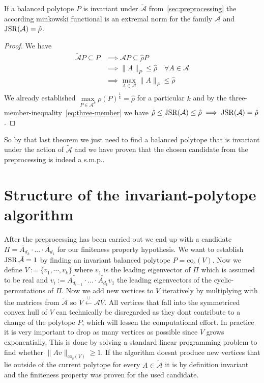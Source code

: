 \begin{theorem}
    If a balanced polytope $P$ is invariant under $\tilde{\mathcal{A}}$ from~\ref{sec:preprocessing}
    the according minkowski functional is an extremal norm for the family $\mathcal{A}$ and $ \operatorname{JSR}(\mathcal{A}) = \hat{\rho}$.
\end{theorem}
\begin{proof}
    We have 
    $$
    \begin{aligned}
    \tilde{\mathcal{A}}P \subseteq  P & \implies \mathcal{A}P \subseteq \hat{\rho}P \\
    & \implies \lVert A \rVert _P \le \hat{\rho} \quad \forall A \in \mathcal{A} \\
    & \implies \max \limits_{A \in \mathcal{A}} \lVert A \rVert _P \le \hat{\rho} \\
    \end{aligned}
    $$
    We already established $\max \limits_{P \in \mathcal{A}^{k}} \rho(P)^{\frac{1}{k}} = \hat{\rho}$ for a particular $k$
    and by the three-member-inequality~\ref{eq:three-member} we have $ \hat{\rho} \le \operatorname{JSR}(\mathcal{A}) \le \hat{\rho} \implies \operatorname{JSR}(\mathcal{A}) = \hat{\rho}$ .
\end{proof}
So by that last theorem we just need to find a balanced polytope that is invariant under the action of $\tilde{\mathcal{A}}$ and we have proven that the chosen candidate from the preprocessing is indeed a s.m.p..

\section{Structure of the invariant-polytope algorithm}
After the preprocessing has been carried out we end up with a candidate $\Pi = \tilde{A_{d_k}} \cdot ... \cdot \tilde{A_{d_1}}$ for our finiteness property hypothesis. We want to establish $\operatorname{JSR}{\tilde{\mathcal{A}}} = 1$ by finding an invariant balanced polytope $P = \text{co}_{\text{s}}(V)$. Now we define $V := \{ v_1, \cdots, v_k \}$ where $v_1$ is the leading eigenvector of $\Pi$ which is assumed to be real and $v_i := \tilde{A_{d_{i-1}}}\cdot ... \cdot \tilde{A_{d_1}}v_1$ the leading eigenvectors of the cyclic-permutations of $\Pi$. 
Now we add new vertices to $V$ iteratively by multiplying with the matrices from $\tilde{\mathcal{A}}$ so $V \xleftarrow{\cup} \mathcal{A}V$. All vertices that fall into the symmetriced convex hull of $V$ can technically be disregarded as they dont contribute to a change of the polytope $P$, which will lessen the computational effort. In practice it is very important to drop as many vertices as possible since $V$ grows exponentially. This is done by solving a standard linear programming problem to find whether $\lVert Av \rVert _{\text{co}_{\text{s}}(V)} \geq 1$. 
If the algorithm doesnt produce new vertices that lie outside of the current polytope for every $A \in \tilde{\mathcal{A}}$ it is by definition invariant and the finiteness property was proven for the used candidate.

